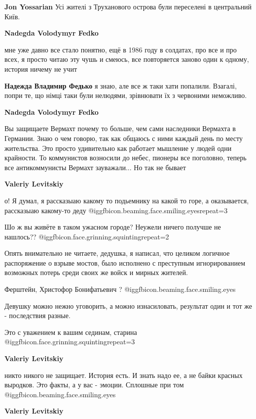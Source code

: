 \begin{itemize}
\begin{itemize}
\begin{itemize}
\textbf{Jon Yossarian} Усі жителі з Труханового острова були переселені в центральний Київ.

\textbf{Nadegda Volodymyr Fedko} 

мне уже давно все стало понятно, ещё в 1986 году в солдатах, про все и про всех, я
просто читаю эту чушь и смеюсь, все повторяется заново один к одному, история
ничему не учит


\textbf{Надежда Владимир Федько} я знаю, але все ж таки хати попалили.
Взагалі, попри те, що німці таки були нелюдями, зрівнювати їх з червоними неможливо.

\textbf{Nadegda Volodymyr Fedko} 

Вы защищаете Вермахт почему то больше, чем сами наследники Вермахта в
Германии. Знаю о чем говорю, так как общаюсь с ними каждый день по месту
жительства. Это просто удивительно как работает мышление у людей одни
крайности. То коммунистов возносили до небес, пионеры все поголовно, теперь все
антикоммунисты Вермахт зауважали... Но так не бывает

\textbf{Valeriy Levitskiy} 

о! Я думал, я рассказыаю какому то подьемнику на какой то горе, а оказывается,
рассказыаю какому-то деду  @igg{fbicon.beaming.face.smiling.eyes}{repeat=3} 

Шо ж вы живёте в таком ужасном городе? Неужели ничего получше не нашлось??  @igg{fbicon.face.grinning.squinting}{repeat=2} 

Опять внимательно не читаете, дедушка, я написал, что целиком логичное
распоряжение о взрыве мостов, было исполнено с преступным игнорированием
возможных потерь среди своих же войск и мирных жителей.

Ферштейн, Христофор Бонифатьевич ?  @igg{fbicon.beaming.face.smiling.eyes} 

Девушку можно нежно уговорить, а можно изнасиловать, результат один и тот же -
последствия разные.

Это с уважением к вашим сединам, старина  @igg{fbicon.face.grinning.squinting}{repeat=3} 

\textbf{Valeriy Levitskiy} 

никто никого не защищает. История есть. И знать надо ее, а не байки красных
выродков. Это факты, а у вас - эмоции. Сплошные при том  @igg{fbicon.beaming.face.smiling.eyes} 

\textbf{Valeriy Levitskiy} 


\end{itemize}
\end{itemize}
\end{itemize}
